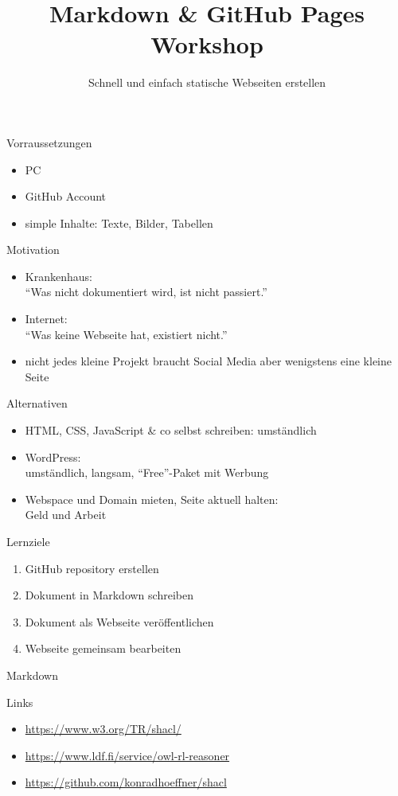 \documentclass[14pt,aspectratio=1610]{beamer}
\title{Markdown \& GitHub Pages Workshop}
\subtitle{Schnell und einfach statische Webseiten erstellen}
\begin{document}
\begin{frame}
\titlepage
\end{frame}

\begin{frame}{Vorraussetzungen}
\begin{itemize}
\item PC
\item GitHub Account
\item simple Inhalte: Texte, Bilder, Tabellen
\end{itemize}
\end{frame}

\begin{frame}{Motivation}
\begin{itemize}
\item Krankenhaus:\\\enquote{Was nicht dokumentiert wird, ist nicht passiert.}
\item Internet:\\\enquote{Was keine Webseite hat, existiert nicht.}
\item nicht jedes kleine Projekt braucht Social Media aber wenigstens eine kleine Seite
\end{itemize}
\end{frame}

\begin{frame}{Alternativen}
\begin{itemize}
\item HTML, CSS, JavaScript \& co selbst schreiben: umständlich
\item WordPress:\\umständlich, langsam, \enquote{Free}-Paket mit Werbung
\item Webspace und Domain mieten, Seite aktuell halten:\\Geld und Arbeit
\end{itemize}
\end{frame}

\begin{frame}{Lernziele}
\begin{enumerate}
\item GitHub repository erstellen
\item Dokument in Markdown schreiben
\item Dokument als Webseite veröffentlichen
\item Webseite gemeinsam bearbeiten
\end{enumerate}
\end{frame}

\begin{frame}[fragile]{Markdown}
\small

\end{frame}


\begin{frame}{Links}
\begin{itemize}
\item \url{https://www.w3.org/TR/shacl/}
\item \url{https://www.ldf.fi/service/owl-rl-reasoner}
\item \url{https://github.com/konradhoeffner/shacl}
\end{itemize}
\end{frame}
\end{document}
